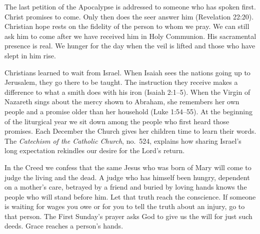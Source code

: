The last petition of the Apocalypse is addressed to someone who has spoken first. Christ promises to come. Only then does the seer answer him (Revelation 22:20). Christian hope rests on the fidelity of the person to whom we pray. We can still ask him to come after we have received him in Holy Communion. His sacramental presence is real. We hunger for the day when the veil is lifted and those who have slept in him rise.

Christians learned to wait from Israel. When Isaiah sees the nations going up to Jerusalem, they go there to be taught. The instruction they receive makes a difference to what a smith does with his iron (Isaiah 2:1--5). When the Virgin of Nazareth sings about the mercy shown to Abraham, she remembers her own people and a promise older than her household (Luke 1:54--55). At the beginning of the liturgical year we sit down among the people who first heard those promises. Each December the Church gives her children time to learn their words. The \emph{Catechism of the Catholic Church}, no.~524, explains how sharing Israel's long expectation rekindles our desire for the Lord's return.

In the Creed we confess that the same Jesus who was born of Mary will come to judge the living and the dead. A judge who has himself been hungry, dependent on a mother's care, betrayed by a friend and buried by loving hands knows the people who will stand before him. Let that truth reach the conscience. If someone is waiting for wages you owe or for you to tell the truth about an injury, go to that person. The First Sunday's prayer asks God to give us the will for just such deeds. Grace reaches a person's hands.
